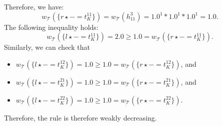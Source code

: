 \begin{example}
\begin{center}
{
        }
      \end{center}
    Therefore, we have: $$w_\mathcal{T}(\{r \mathop{\star} - \mathop{=} t_K^{11}\}) \mathop{=} w_\mathcal{T}(h_{11}^3) \mathop{=} 1.0^1 * 1.0^1 * 1.0 ^ 1 \mathop{=} 1.0.$$
    The following inequality holds:
    $$w_\mathcal{T}(\{l \mathop{\star} - \mathop{=} t_K^{11}\}) \mathop{=} 2.0 \mathop{\geq} 1.0 \mathop{=} w_\mathcal{T}(\{r \mathop{\star} - \mathop{=} t_K^{11}\}).$$
    Similarly, we can check that 
        \begin{itemize}
            \item $w_\mathcal{T}(\{l \mathop{\star} - \mathop{=} t_K^{12}\}) \mathop{=} 1.0 \mathop{\geq} 1.0 \mathop{=} w_\mathcal{T}(\{r \mathop{\star} - \mathop{=} t_K^{12}\})$, and
            \item $w_\mathcal{T}(\{l \mathop{\star} - \mathop{=} t_K^{21}\}) \mathop{=} 1.0 \mathop{\geq} 1.0 \mathop{=} w_\mathcal{T}(\{r \mathop{\star} - \mathop{=} t_K^{21}\})$, and
            \item $w_\mathcal{T}(\{l \mathop{\star} - \mathop{=} t_K^{22}\}) \mathop{=} 1.0 \mathop{\geq} 1.0 \mathop{=} w_\mathcal{T}(\{r \mathop{\star} - \mathop{=} t_K^{22}\})$.
        \end{itemize}
    Therefore, the rule is therefore weakly decreasing.
    

\end{example}
